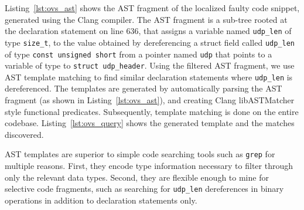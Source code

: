 Listing~\ref{lst:ovs_ast} shows the AST fragment of the localized faulty code snippet, generated using the Clang compiler.
The AST fragment is a sub-tree rooted at the declaration statement on line 636, that assigns a variable named {\tt udp\_len} of type {\tt size\_t}, to the value obtained by dereferencing a struct field called {\tt udp\_len} of type {\tt const unsigned short} from a pointer named {\tt udp} that points to a variable of type to {\tt struct udp\_header}.
Using the filtered AST fragment, we use AST template matching to find similar declaration statements where {\tt udp\_len} is dereferenced.
The templates are generated by automatically parsing the AST fragment (as shown in Listing~\ref{lst:ovs_ast}), and creating Clang libASTMatcher~\cite{libastmatcher} style functional predicates.
Subsequently, template matching is done on the entire codebase.
Listing~\ref{lst:ovs_query} shows the generated template and the matches discovered.



AST templates are superior to simple code searching tools such as {\tt grep} for multiple reasons.
First, they encode type information necessary to filter through only the relevant data types.
Second, they are flexible enough to mine for selective code fragments, such as searching for {\tt udp\_len} dereferences in binary operations in addition to declaration statements only.



\begin{table*}[!tbh]

\centering
  
\end{table*}

